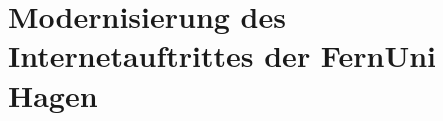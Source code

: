\chapter{Modernisierung des Internetauftrittes der FernUni Hagen}
    \label{chapter:FernUniRelaunch}